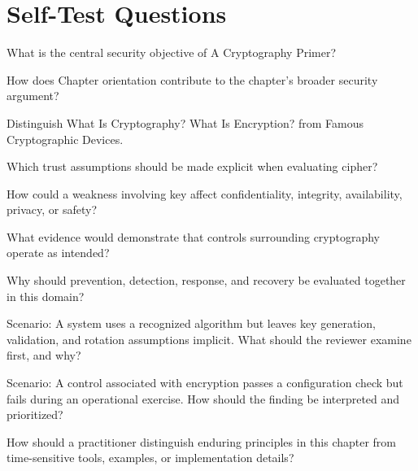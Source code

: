 \documentclass[11pt,letterpaper]{article}
\begin{document}
\section*{Self-Test Questions}
\begin{CornellRecallList}
\item What is the central security objective of A Cryptography Primer?
\item How does Chapter orientation contribute to the chapter's broader security argument?
\item Distinguish What Is Cryptography? What Is Encryption? from Famous Cryptographic Devices.
\item Which trust assumptions should be made explicit when evaluating cipher?
\item How could a weakness involving key affect confidentiality, integrity, availability, privacy, or safety?
\item What evidence would demonstrate that controls surrounding cryptography operate as intended?
\item Why should prevention, detection, response, and recovery be evaluated together in this domain?
\item Scenario: A system uses a recognized algorithm but leaves key generation, validation, and rotation assumptions implicit. What should the reviewer examine first, and why?
\item Scenario: A control associated with encryption passes a configuration check but fails during an operational exercise. How should the finding be interpreted and prioritized?
\item How should a practitioner distinguish enduring principles in this chapter from time-sensitive tools, examples, or implementation details?
\end{CornellRecallList}
\end{document}
